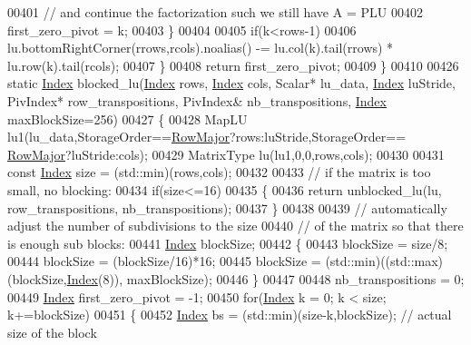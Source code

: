 \begin{DoxyCode}
00401         \textcolor{comment}{// and continue the factorization such we still have A = PLU}
00402         first\_zero\_pivot = k;
00403       \}
00404 
00405       \textcolor{keywordflow}{if}(k<rows-1)
00406         lu.bottomRightCorner(rrows,rcols).noalias() -= lu.col(k).tail(rrows) * lu.row(k).tail(rcols);
00407     \}
00408     \textcolor{keywordflow}{return} first\_zero\_pivot;
00409   \}
00410 
00426   \textcolor{keyword}{static} \hyperlink{namespace_eigen_a62e77e0933482dafde8fe197d9a2cfde}{Index} blocked\_lu(\hyperlink{namespace_eigen_a62e77e0933482dafde8fe197d9a2cfde}{Index} rows, \hyperlink{namespace_eigen_a62e77e0933482dafde8fe197d9a2cfde}{Index} cols, Scalar* lu\_data, 
      \hyperlink{namespace_eigen_a62e77e0933482dafde8fe197d9a2cfde}{Index} luStride, PivIndex* row\_transpositions, PivIndex& nb\_transpositions, 
      \hyperlink{namespace_eigen_a62e77e0933482dafde8fe197d9a2cfde}{Index} maxBlockSize=256)
00427   \{
00428     MapLU lu1(lu\_data,StorageOrder==\hyperlink{group__enums_ggaacded1a18ae58b0f554751f6cdf9eb13acfcde9cd8677c5f7caf6bd603666aae3}{RowMajor}?rows:luStride,StorageOrder==
      \hyperlink{group__enums_ggaacded1a18ae58b0f554751f6cdf9eb13acfcde9cd8677c5f7caf6bd603666aae3}{RowMajor}?luStride:cols);
00429     MatrixType lu(lu1,0,0,rows,cols);
00430 
00431     \textcolor{keyword}{const} \hyperlink{namespace_eigen_a62e77e0933482dafde8fe197d9a2cfde}{Index} size = (std::min)(rows,cols);
00432 
00433     \textcolor{comment}{// if the matrix is too small, no blocking:}
00434     \textcolor{keywordflow}{if}(size<=16)
00435     \{
00436       \textcolor{keywordflow}{return} unblocked\_lu(lu, row\_transpositions, nb\_transpositions);
00437     \}
00438 
00439     \textcolor{comment}{// automatically adjust the number of subdivisions to the size}
00440     \textcolor{comment}{// of the matrix so that there is enough sub blocks:}
00441     \hyperlink{namespace_eigen_a62e77e0933482dafde8fe197d9a2cfde}{Index} blockSize;
00442     \{
00443       blockSize = size/8;
00444       blockSize = (blockSize/16)*16;
00445       blockSize = (std::min)((std::max)(blockSize,\hyperlink{namespace_eigen_a62e77e0933482dafde8fe197d9a2cfde}{Index}(8)), maxBlockSize);
00446     \}
00447 
00448     nb\_transpositions = 0;
00449     \hyperlink{namespace_eigen_a62e77e0933482dafde8fe197d9a2cfde}{Index} first\_zero\_pivot = -1;
00450     \textcolor{keywordflow}{for}(\hyperlink{namespace_eigen_a62e77e0933482dafde8fe197d9a2cfde}{Index} k = 0; k < size; k+=blockSize)
00451     \{
00452       \hyperlink{namespace_eigen_a62e77e0933482dafde8fe197d9a2cfde}{Index} bs = (std::min)(size-k,blockSize); \textcolor{comment}{// actual size of the block}

\end{DoxyCode}
